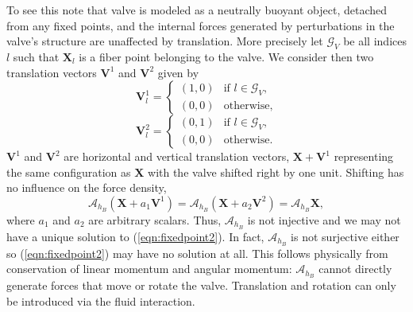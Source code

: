 \documentclass[preprint,12pt]{elsarticle}
\begin{document}
To see this note that valve is modeled as a neutrally buoyant object, detached from any fixed points, and the internal forces generated by perturbations in the valve's structure are unaffected by translation. More precisely let $\mathcal{G}_V$ be all indices $l$ such that $\mathbf{X}_l$ is a fiber point belonging to the valve. We consider then two translation vectors $\mathbf{V}^1$ and $\mathbf{V}^2$ given by
\begin{equation}
\mathbf{V}^1_l =
\begin{cases}
(1,0)& \textrm{if } l\in \mathcal{G}_V, \\
(0,0)& \textrm{otherwise},
\end{cases}
\end{equation}
\begin{equation}
\mathbf{V}^2_l =
\begin{cases}
(0,1)& \textrm{if } l\in \mathcal{G}_V, \\
(0,0)& \textrm{otherwise}.
\end{cases}
\end{equation}
$\mathbf{V}^1$ and $\mathbf{V}^2$ are horizontal and vertical translation vectors, $\mathbf{X}+\mathbf{V}^1$ representing the same configuration as $\mathbf{X}$ with the valve shifted right by one unit. Shifting has no influence on the force density,
\begin{equation}
\mathcal{A}_{h_B}(\mathbf{X}+a_1 \mathbf{V}^1) = \mathcal{A}_{h_B}(\mathbf{X}+a_2 \mathbf{V}^2) = \mathcal{A}_{h_B}\mathbf{X},
\end{equation}
where $a_1$ and $a_2$ are arbitrary scalars.
Thus,  $\mathcal{A}_{h_B}$ is not injective and we may not have a unique solution to (\ref{eqn:fixedpoint2}). In fact, $\mathcal{A}_{h_B}$ is not surjective either so (\ref{eqn:fixedpoint2}) may have no solution at all. This follows physically from conservation of linear momentum and angular momentum: $\mathcal{A}_{h_B}$ cannot directly generate forces that move or rotate the valve. Translation and rotation can only be introduced via the fluid interaction. 
\end{document}
